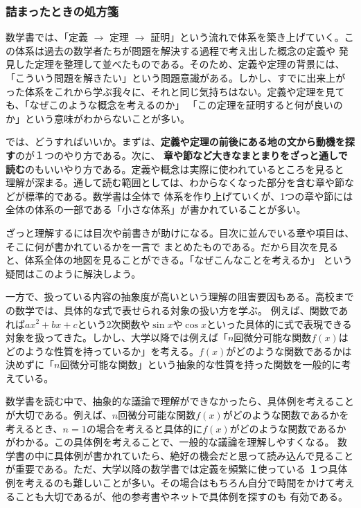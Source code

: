 \documentclass{jlreq}
\begin{document}
\subsubsection{詰まったときの処方箋}
数学書では、「定義 $\rightarrow$ 定理 $\rightarrow$ 証明」という流れで体系を築き上げていく。この体系は過去の数学者たちが問題を解決する過程で考え出した概念の定義や
発見した定理を整理して並べたものである。そのため、定義や定理の背景には、「こういう問題を解きたい」という問題意識がある。しかし、すでに出来上がった体系をこれから学ぶ我々に、それと同じ気持ちはない。定義や定理を見ても、「なぜこのような概念を考えるのか」
「この定理を証明すると何が良いのか」という意味がわからないことが多い。

では、どうすればいいか。まずは、\textbf{定義や定理の前後にある地の文から動機を探す}のが１つのやり方である。次に、
\textbf{章や節など大きなまとまりをざっと通しで読む}のもいいやり方である。定義や概念は実際に使われているところを見ると
理解が深まる。通して読む範囲としては、わからなくなった部分を含む章や節などが標準的である。数学書は全体で
体系を作り上げていくが、1つの章や節には全体の体系の一部である「小さな体系」が書かれていることが多い。

ざっと理解するには目次や前書きが助けになる。目次に並んでいる章や項目は、そこに何が書かれているかを一言で
まとめたものである。だから目次を見ると、体系全体の地図を見ることができる。「なぜこんなことを考えるか」
という疑問はこのように解決しよう。

一方で、扱っている内容の抽象度が高いという理解の阻害要因もある。高校までの数学では、具体的な式で表せられる対象の扱い方を学ぶ。
例えば、関数であれば$a x^2 + b x + c$という2次関数や$\sin x$や$\cos x$といった具体的に式で表現できる対象を扱ってきた。しかし、大学以降では例えば「$n$回微分可能な関数$f(x)$はどのような性質を持っているか」を考える。$f(x)$がどのような関数であるかは
決めずに「$n$回微分可能な関数」という抽象的な性質を持った関数を一般的に考えている。

数学書を読む中で、抽象的な議論で理解ができなかったら、具体例を考えることが大切である。例えば、$n$回微分可能な関数$f(x)$がどのような関数であるかを考えるとき、$n=1$の場合を考えると具体的に$f(x)$がどのような関数であるかがわかる。この具体例を考えることで、一般的な議論を理解しやすくなる。
数学書の中に具体例が書かれていたら、絶好の機会だと思って読み込んで見ることが重要である。ただ、大学以降の数学書では定義を頻繁に使っている
１つ具体例を考えるのも難しいことが多い。その場合はもちろん自分で時間をかけて考えることも大切であるが、他の参考書やネットで具体例を探すのも
有効である。
\end{document}

